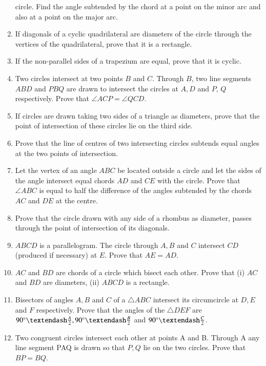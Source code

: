 \begin{enumerate}[label=\thesubsection.\arabic*,ref=\thesubsection.\theenumi]
circle. Find the angle subtended by the chord at
a point on the minor arc and also at a point on the
major arc.
\item If diagonals of a cyclic quadrilateral are diameters of the circle through the vertices of
the quadrilateral, prove that it is a rectangle.
\item If the non-parallel sides of a trapezium are equal, prove that it is cyclic.
	\iffalse
\begin{enumerate}


\end{enumerate}
\fi

\item Two circles intersect at two points $B$ and $C$.
Through $B$, two line segments $ABD$ and $PBQ$
are drawn to intersect the circles at $A, D$ and $P$,
$Q$ respectively. Prove that
$\angle ACP = \angle QCD$.
\item If circles are drawn taking two sides of a triangle as diameters, prove that the point of
intersection of these circles lie on the third side.
\item Prove that the line of centres of two intersecting circles subtends equal angles at the
two points of intersection.
\item Let the vertex of an angle $ABC$ be located outside a circle and let the sides of the angle
intersect equal chords $AD$ and $CE$ with the circle. Prove that $\angle ABC$ is equal to half the
difference of the angles subtended by the chords $AC$ and $DE$ at the centre.
\item Prove that the circle drawn with any side of a rhombus as diameter, passes through
the point of intersection of its diagonals.
\item $ABCD$ is a parallelogram. The circle through $A, B$ and $C$ intersect $CD$ (produced if
necessary) at $E$. Prove that $AE = AD$.
\item $AC$ and $BD$ are chords of a circle which bisect each other. Prove that (i) $AC$ and $BD$ are
diameters, (ii) $ABCD$ is a rectangle.
\item Bisectors of angles $A, B$ and $C$ of a $\triangle ABC$ intersect its circumcircle at $D, E$ and
$F$ respectively. Prove that the angles of the $\triangle DEF$ are $90\degree – \frac{A}{2}, 90\degree – \frac{B}{2}$ and $90\degree – \frac{C}{2}$.
\item Two congruent circles intersect each other at points A and B. Through A any line segment PAQ is drawn so that $P, Q$ lie on the two circles. Prove that $BP = BQ$.

\end{enumerate}
